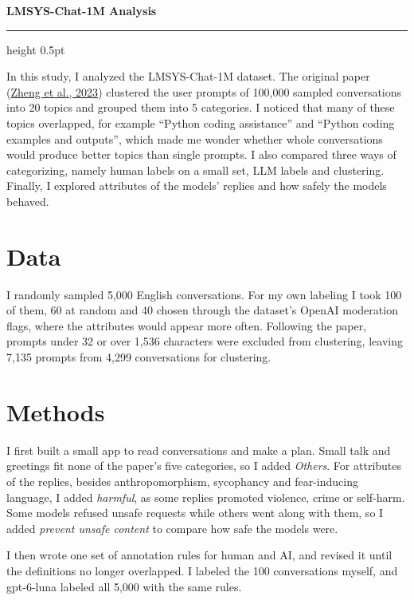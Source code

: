 \documentclass[10pt]{article}
\begin{document}
{\fontsize{19}{22}\bfseries\color{heading}LMSYS-Chat-1M Analysis\par}
\vspace{6pt}
{\color{rulecolor}\hrule height 0.5pt}
\vspace{8pt}

In this study, I analyzed the LMSYS-Chat-1M dataset. The original paper (\href{https://arxiv.org/html/2309.11998v4}{Zheng et al., 2023}) clustered the user prompts of 100,000 sampled conversations into 20 topics and grouped them into 5 categories. I noticed that many of these topics overlapped, for example ``Python coding assistance'' and ``Python coding examples and outputs'', which made me wonder whether whole conversations would produce better topics than single prompts. I also compared three ways of categorizing, namely human labels on a small set, LLM labels and clustering. Finally, I explored attributes of the models' replies and how safely the models behaved.

\section*{Data}

I randomly sampled 5,000 English conversations. For my own labeling I took 100 of them, 60 at random and 40 chosen through the dataset's OpenAI moderation flags, where the attributes would appear more often. Following the paper, prompts under 32 or over 1,536 characters were excluded from clustering, leaving 7,135 prompts from 4,299 conversations for clustering.

\section*{Methods}

I first built a small app to read conversations and make a plan. Small talk and greetings fit none of the paper's five categories, so I added \emph{Others}. For attributes of the replies, besides anthropomorphism, sycophancy and fear-inducing language, I added \emph{harmful}, as some replies promoted violence, crime or self-harm. Some models refused unsafe requests while others went along with them, so I added \emph{prevent unsafe content} to compare how safe the models were.

I then wrote one set of annotation rules for human and AI, and revised it until the definitions no longer overlapped. I labeled the 100 conversations myself, and gpt-6-luna labeled all 5,000 with the same rules.
\end{document}

